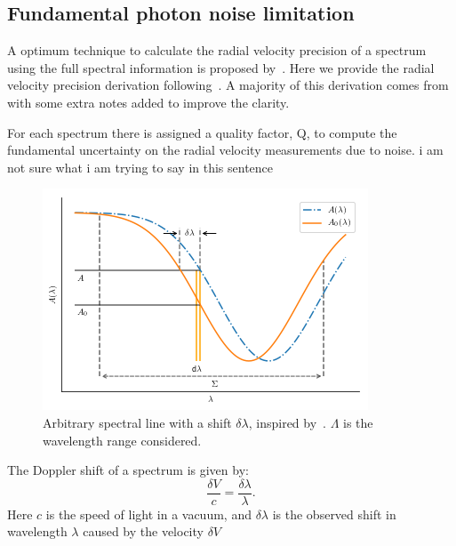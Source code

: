 \subsection{Fundamental photon noise limitation}

A optimum technique to calculate the radial velocity precision of a spectrum using the full spectral information is proposed by~\citet{connes_absolute_1985}. Here we provide the radial velocity precision derivation following~\citet{connes_absolute_1985, bouchy_fundamental_2001, figueira_radial_2016}. A majority of this derivation comes from~\citet{bouchy_fundamental_2001} with some extra notes added to improve the clarity.

For each spectrum there is assigned a quality factor, Q, to compute the fundamental uncertainty on the radial velocity measurements due to noise. {\red{} i am not sure what i am trying to say in this sentence}

\begin{figure}
    \centering
    \includegraphics[width=0.7\linewidth]{figures/precision_derivation.png}
    \caption{Arbitrary spectral line with a shift \(\delta \lambda\), inspired by~\citet{connes_absolute_1985}.  \(\Lambda\) is the wavelength range considered.}
    \label{fig:precisionderivation}
\end{figure}

The Doppler shift of a spectrum is given by:
\begin{equation}
\frac{\delta V}{c} = \frac{\delta \lambda}{\lambda}.
\label{eq:dopplershift}
\end{equation}
Here \(c\) is the speed of light in a vacuum, and \(\delta \lambda\) is the observed shift in wavelength \(\lambda\) caused by the velocity \(\delta V\)

